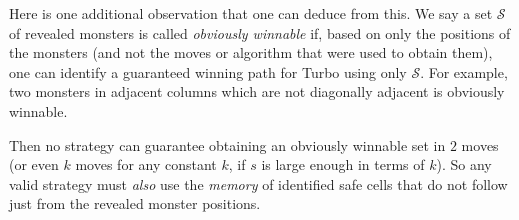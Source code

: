 \begin{remark*}
  Here is one additional observation that one can deduce from this.
  We say a set $\mathcal S$ of revealed monsters is called \emph{obviously winnable} if,
  based on only the positions of the monsters
  (and not the moves or algorithm that were used to obtain them),
  one can identify a guaranteed winning path for Turbo using only $\mathcal S$.
  For example, two monsters in adjacent columns which are not diagonally
  adjacent is obviously winnable.

  Then no strategy can guarantee obtaining an obviously winnable set in $2$ moves
  (or even $k$ moves for any constant $k$, if $s$ is large enough in terms of $k$).
  So any valid strategy must \emph{also} use the \emph{memory} of identified safe cells
  that do not follow just from the revealed monster positions.
\end{remark*}
\pagebreak